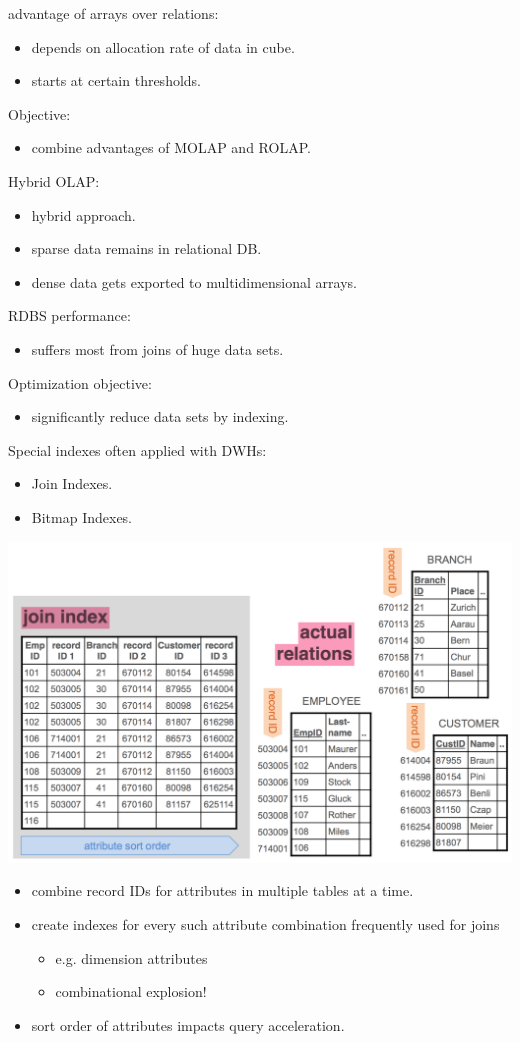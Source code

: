 \begin{breakbox}
\newline advantage of arrays over relations:
\begin{itemize}
	\item depends on allocation rate of data in cube.
	\item starts at certain thresholds.
\end{itemize}
Objective:
\begin{itemize}
	\item combine advantages of MOLAP and ROLAP.
\end{itemize}
Hybrid OLAP:
\begin{itemize}
	\item hybrid approach.
	\item sparse data remains in relational DB.
	\item dense data gets exported to multidimensional arrays.
\end{itemize}
\end{breakbox}

\begin{breakbox}
\newline RDBS performance:
\begin{itemize}
	\item suffers most from joins of huge data sets.
\end{itemize}
 Optimization objective:
\begin{itemize}
	\item significantly reduce data sets by indexing.
\end{itemize}
Special indexes often applied with DWHs:
\begin{itemize}
	\item Join Indexes.
	\item Bitmap Indexes.
\end{itemize}
\end{breakbox}

\begin{breakbox}
\begin{center}
\includegraphics[width=.15\textwidth]{slides_images/join_indexes}
\end{center}
\begin{itemize}
	\item combine record IDs for attributes in multiple tables at a time.
	\item create indexes for every such attribute combination frequently used for joins
	\begin{itemize}
		\item e.g. dimension attributes
		\item combinational explosion!
	\end{itemize}
	\item sort order of attributes impacts query acceleration.
\end{itemize}
\end{breakbox}

